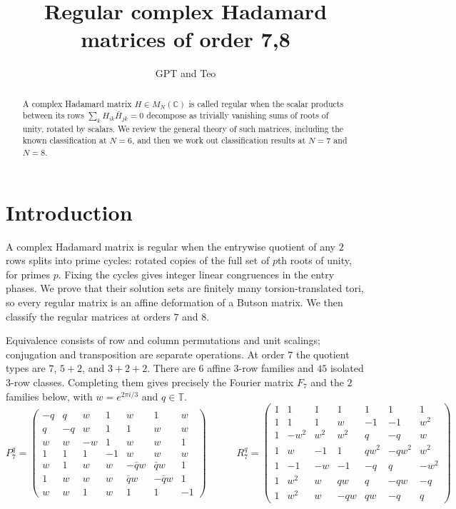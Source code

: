 \documentclass[11pt,a4paper]{article}
\title{Regular complex Hadamard matrices of order 7,8}
\author{GPT and Teo}
\date{}
\theoremstyle{plain}
\theoremstyle{definition}
\numberwithin{equation}{section}
\begin{document}
\maketitle

\begin{abstract}
A complex Hadamard matrix $H\in M_N(\mathbb C)$ is called regular when the scalar products between its rows $\sum_kH_{ik}\bar{H}_{jk}=0$ decompose as trivially vanishing sums of roots of unity, rotated by scalars. We review the general theory of such matrices, including the known classification at $N=6$, and then we work out classification results at $N=7$ and $N=8$.
\end{abstract}

\begingroup
\setlength{\parskip}{0pt}
\makeatletter
\patchcmd{\l@section}{\addvspace{1.0em \@plus\p@}}{\addvspace{0pt}}{}{}
\makeatother
\tableofcontents
\endgroup

\section*{Introduction}

A complex Hadamard matrix is regular when the entrywise quotient of any $2$ rows splits into prime cycles: rotated copies of the full set of $p$th roots of unity, for primes $p$. Fixing the cycles gives integer linear congruences in the entry phases. We prove that their solution sets are finitely many torsion-translated tori, so every regular matrix is an affine deformation of a Butson matrix. We then classify the regular matrices at orders $7$ and $8$.

Equivalence consists of row and column permutations and unit scalings; conjugation and transposition are separate operations. At order $7$ the quotient types are $7$, $5+2$, and $3+2+2$. There are $6$ affine $3$-row families and $45$ isolated $3$-row classes. Completing them gives precisely the Fourier matrix $F_7$ and the $2$ families below, with $w=e^{2\pi i/3}$ and $q\in\mathbb T$.
{\setlength{\arraycolsep}{2.5pt}
$$P_7^q=\begin{pmatrix}
-q&q&w&1&w&1&w\\
q&-q&w&1&1&w&w\\
w&w&-w&1&w&w&1\\
1&1&1&-1&w&w&w\\
w&1&w&w&-\bar{q} w&\bar{q} w&1\\
1&w&w&w&\bar{q} w&-\bar{q} w&1\\
w&w&1&w&1&1&-1
\end{pmatrix}\qquad\quad R_7^q=\begin{pmatrix}
1&1&1&1&1&1&1\\
1&1&1&w&-1&-1&w^2\\
1&-w^2&w^2&w^2&q&-q&w\\
1&w&-1&1&qw^2&-qw^2&w^2\\
1&-1&-w&-1&-q&q&-w^2\\
1&w^2&w&qw&q&-qw&-q\\
1&w^2&w&-qw&qw&-q&q
\end{pmatrix}$$
}
\end{document}
